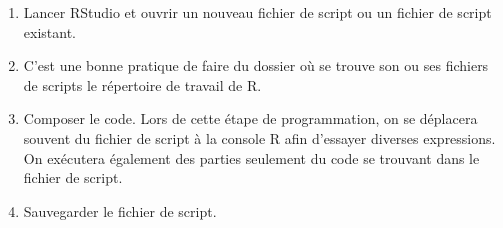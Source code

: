 \begin{enumerate}
\item Lancer RStudio et ouvrir un nouveau fichier de script ou un
  fichier de script existant.
\item C'est une bonne pratique de faire du dossier où se trouve son ou
  ses fichiers de scripts le répertoire de travail de R.
\item Composer le code. Lors de cette étape de programmation, on se
  déplacera souvent du fichier de script à la console R afin
  d'essayer diverses expressions. On exécutera également des parties
  seulement du code se trouvant dans le fichier de script.
\item Sauvegarder le fichier de script.
  \begin{trivlist}
  \item

\end{trivlist}
\end{enumerate}
